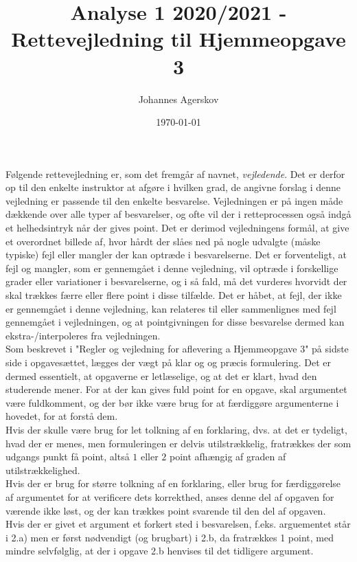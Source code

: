 \documentclass{article}
\title{Analyse 1 2020/2021 - Rettevejledning til Hjemmeopgave 3}
\author{Johannes Agerskov}
\date{\today}
\begin{document}
	
	\maketitle
Følgende rettevejledning er, som det fremgår af navnet, \emph{vejledende}. Det er derfor op til den enkelte instruktor at afgøre i hvilken grad, de angivne forslag i denne vejledning er passende til den enkelte besvarelse. Vejledningen er på ingen måde dækkende over alle typer af besvarelser, og ofte vil der i retteprocessen også indgå et helhedsintryk når der gives point. Det er derimod vejledningens formål, at give et overordnet billede af, hvor hårdt der slåes ned på nogle udvalgte (måske typiske) fejl eller mangler der kan optræde i besvarelserne. Det er forventeligt, at fejl og mangler, som er gennemgået i denne vejledning, vil optræde i forskellige grader eller variationer i besvarelserne, og i så fald, må det vurderes hvorvidt der skal trækkes færre eller flere point i disse tilfælde. Det er håbet, at fejl, der ikke er gennemgået i denne vejledning, kan relateres til eller sammenlignes med fejl gennemgået i vejledningen, og at pointgivningen for disse besvarelse dermed kan ekstra-/interpoleres fra vejledningen.
\vspace*{0.5cm}\\
Som beskrevet i "Regler og vejledning for aflevering a Hjemmeopgave 3" på sidste side i opgavesættet, lægges der vægt på klar og og præcis formulering. Det er dermed essentielt, at opgaverne er letlæselige, og at det er klart, hvad den studerende mener. For at der kan gives fuld point for en opgave, skal argumentet være fuldkomment, og der bør ikke være brug for at færdiggøre argumenterne i hovedet, for at forstå dem.
\vspace*{0.2cm}
\\
Hvis der skulle være brug for let tolkning af en forklaring, dvs. at det er tydeligt, hvad der er menes, men formuleringen er delvis utilstrækkelig, fratrækkes der som udgangs punkt få point, altså $ 1 $ eller $ 2 $ point afhængig af graden af utilstrækkelighed.
\vspace*{0.2cm}\\
Hvis der er brug for større tolkning af en forklaring, eller brug for færdiggørelse af argumentet for at verificere dets korrekthed, anses denne del af opgaven for værende ikke løst, og der kan trækkes point svarende til den del af opgaven.
\vspace*{0.2cm}\\
Hvis der er givet et argument et forkert sted i besvarelsen, f.eks. arguementet står i 2.a) men er først nødvendigt (og brugbart) i 2.b, da fratrækkes 1 point, med mindre selvfølglig, at der i opgave 2.b henvises til det tidligere argument.
\end{document}

